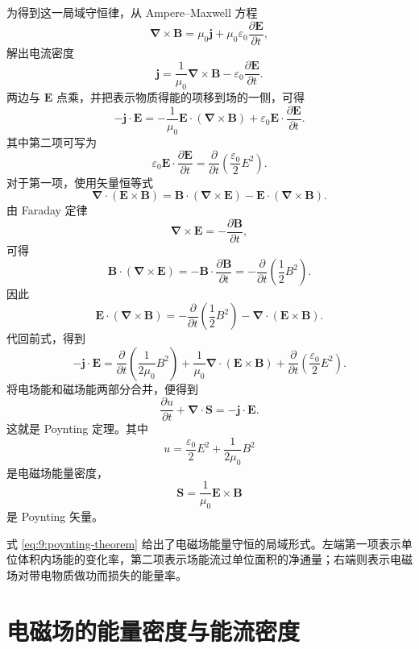 为得到这一局域守恒律，从 Ampere--Maxwell 方程
\[
\bm{\nabla}\times\bm{B}
=
\mu_{0}\bm{j}
+
\mu_{0}\varepsilon_{0}
\frac{\partial\bm{E}}{\partial t},
\]
解出电流密度
\[
\bm{j}
=
\frac{1}{\mu_{0}}\bm{\nabla}\times\bm{B}
-
\varepsilon_{0}
\frac{\partial\bm{E}}{\partial t}.
\]
两边与 $\bm{E}$ 点乘，并把表示物质得能的项移到场的一侧，可得
\[
-\bm{j}\cdot\bm{E}
=
-\frac{1}{\mu_{0}}
\bm{E}\cdot(\bm{\nabla}\times\bm{B})
+
\varepsilon_{0}
\bm{E}\cdot
\frac{\partial\bm{E}}{\partial t}.
\]
其中第二项可写为
\[
\varepsilon_{0}
\bm{E}\cdot
\frac{\partial\bm{E}}{\partial t}
=
\frac{\partial}{\partial t}
\left(
\frac{\varepsilon_{0}}{2}E^{2}
\right).
\]
对于第一项，使用矢量恒等式
\[
\bm{\nabla}\cdot(\bm{E}\times\bm{B})
=
\bm{B}\cdot(\bm{\nabla}\times\bm{E})
-
\bm{E}\cdot(\bm{\nabla}\times\bm{B}).
\]
由 Faraday 定律
\[
\bm{\nabla}\times\bm{E}
=
-\frac{\partial\bm{B}}{\partial t},
\]
可得
\[
\bm{B}\cdot(\bm{\nabla}\times\bm{E})
=
-\bm{B}\cdot\frac{\partial\bm{B}}{\partial t}
=
-\frac{\partial}{\partial t}
\left(
\frac{1}{2}B^{2}
\right).
\]
因此
\[
\bm{E}\cdot(\bm{\nabla}\times\bm{B})
=
-\frac{\partial}{\partial t}
\left(
\frac{1}{2}B^{2}
\right)
-
\bm{\nabla}\cdot(\bm{E}\times\bm{B}).
\]
代回前式，得到
\[
-\bm{j}\cdot\bm{E}
=
\frac{\partial}{\partial t}
\left(
\frac{1}{2\mu_{0}}B^{2}
\right)
+
\frac{1}{\mu_{0}}
\bm{\nabla}\cdot(\bm{E}\times\bm{B})
+
\frac{\partial}{\partial t}
\left(
\frac{\varepsilon_{0}}{2}E^{2}
\right).
\]
将电场能和磁场能两部分合并，便得到
\begin{equation}
	\frac{\partial u}{\partial t}
	+
	\bm{\nabla}\cdot\bm{S}
	=
	-\bm{j}\cdot\bm{E}.
	\label{eq:9:poynting-theorem}
\end{equation}
这就是 Poynting 定理。其中
\begin{equation}
	u
	=
	\frac{\varepsilon_{0}}{2}E^{2}
	+
	\frac{1}{2\mu_{0}}B^{2}
	\label{eq:9:energy-density}
\end{equation}
是电磁场能量密度，
\begin{equation}
	\bm{S}
	=
	\frac{1}{\mu_{0}}\bm{E}\times\bm{B}
	\label{eq:9:poynting-vector}
\end{equation}
是 Poynting 矢量。

式 \eqref{eq:9:poynting-theorem} 给出了电磁场能量守恒的局域形式。左端第一项表示单位体积内场能的变化率，第二项表示场能流过单位面积的净通量；右端则表示电磁场对带电物质做功而损失的能量率。

\section{电磁场的能量密度与能流密度}

